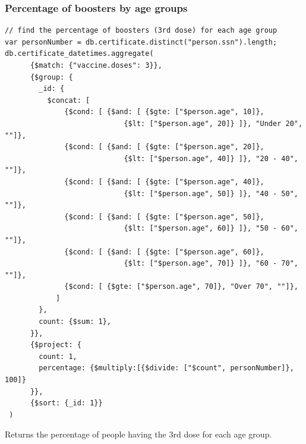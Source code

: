 \documentclass[12pt, a4paper]{article}
\begin{document}
\subsubsection{Percentage of boosters by age groups}
\begin{tcolorbox}[fontupper=\scriptsize]
    \begin{verbatim}
// find the percentage of boosters (3rd dose) for each age group
var personNumber = db.certificate.distinct("person.ssn").length;
db.certificate_datetimes.aggregate(
      {$match: {"vaccine.doses": 3}},
      {$group: {
        _id: {
          $concat: [
              {$cond: [ {$and: [ {$gte: ["$person.age", 10]},
                            {$lt: ["$person.age", 20]} ]}, "Under 20", ""]},
              {$cond: [ {$and: [ {$gte: ["$person.age", 20]}, 
                            {$lt: ["$person.age", 40]} ]}, "20 - 40", ""]},
              {$cond: [ {$and: [ {$gte: ["$person.age", 40]}, 
                            {$lt: ["$person.age", 50]} ]}, "40 - 50", ""]},
              {$cond: [ {$and: [ {$gte: ["$person.age", 50]}, 
                            {$lt: ["$person.age", 60]} ]}, "50 - 60", ""]},
              {$cond: [ {$and: [ {$gte: ["$person.age", 60]}, 
                            {$lt: ["$person.age", 70]} ]}, "60 - 70", ""]},
              {$cond: [ {$gte: ["$person.age", 70]}, "Over 70", ""]},
            ]
        },
        count: {$sum: 1},
      }},
      {$project: {
        count: 1,
        percentage: {$multiply:[{$divide: ["$count", personNumber]}, 100]}
      }},
      {$sort: {_id: 1}}
 )
    \end{verbatim}
\end{tcolorbox}
\noindent 
Returns the percentage of people having the 3rd dose for each age group.
\end{document}
